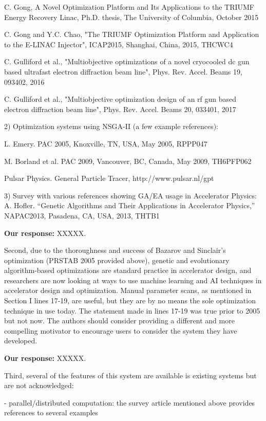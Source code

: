 \documentclass{article}
\begin{document}
C. Gong, A Novel Optimization Platform and Its Applications to the
TRIUMF Energy Recovery Linac, Ph.D. thesis, The University of
Columbia, October 2015

C. Gong and Y.C. Chao, "The TRIUMF Optimization Platform and
Application to the E-LINAC Injector", ICAP2015, Shanghai, China, 2015,
THCWC4

C. Gulliford et al., "Multiobjective optimizations of a novel
cryocooled dc gun based ultrafast electron diffraction beam line",
Phys. Rev. Accel. Beams 19, 093402, 2016

C. Gulliford et al., "Multiobjective optimization design of an rf gun
based electron diffraction beam line", Phys. Rev. Accel. Beams 20,
033401, 2017

2) Optimization systems using NSGA-II (a few example references):

L. Emery. PAC 2005, Knoxville, TN, USA, May 2005, RPPP047

M. Borland et al. PAC 2009, Vancouver, BC, Canada, May 2009, TH6PFP062

Pulsar Physics. General Particle Tracer, http://www.pulsar.nl/gpt

3) Survey with various references showing GA/EA usage in Accelerator
Physics: A. Hofler. “Genetic Algorithms and Their Applications in
Accelerator Physics,” NAPAC2013, Pasadena, CA, USA, 2013, THTB1

{\bf Our response:} {\color{blue} XXXXX.}





Second, due to the thoroughness and success of Bazarov and Sinclair’s
optimization (PRSTAB 2005 provided above), genetic and evolutionary
algorithm-based optimizations are standard practice in accelerator
design, and researchers are now looking at ways to use machine
learning and AI techniques in accelerator design and optimization.
Manual parameter scans, as mentioned in Section I lines 17-19, are
useful, but they are by no means the sole optimization technique in
use today. The statement made in lines 17-19 was true prior to 2005
but not now. The authors should consider providing a different and
more compelling motivator to encourage users to consider the system
they have developed.

{\bf Our response:} {\color{blue} XXXXX.}

Third, several of the features of this system are available is
existing systems but are not acknowledged:

- parallel/distributed computation: the survey article mentioned above
provides references to several examples
\end{document}
